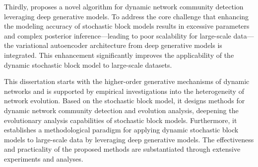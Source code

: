 {Thirdly, proposes a novel algorithm for dynamic network community detection leveraging deep generative models. To address the core challenge that enhancing the modeling accuracy of stochastic block models results in excessive parameters and complex posterior inference—leading to poor scalability for large-scale data—the variational autoencoder architecture from deep generative models is integrated. This enhancement significantly improves the applicability of the dynamic stochastic block model to large-scale datasets.

This dissertation starts with the higher-order generative mechanisms of dynamic networks and is supported by empirical investigations into the heterogeneity of network evolution. Based on the stochastic block model, it designs methods for dynamic network community detection and evolution analysis, deepening the evolutionary analysis capabilities of stochastic block models. Furthermore, it establishes a methodological paradigm for applying dynamic stochastic block models to large-scale data by leveraging deep generative models. The effectiveness and practicality of the proposed methods are substantiated through extensive experiments and analyses.


}


\makecover

\clearpage



